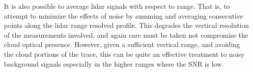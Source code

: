 It is also possible to average lidar signals with respect to
range. That is, to attempt to minimize the effects of noise
by summing and averaging consecutive points along the lidar
range resolved profile. This degrades the vertical
resolution of the measurements involved, and again care must
be taken not compromise the cloud optical presence. However,
given a sufficient vertical range, and avoiding the cloud portions
of the trace, this can be quite an effective treatment to noisy
background signals especially in the higher ranges where the
SNR is low.
